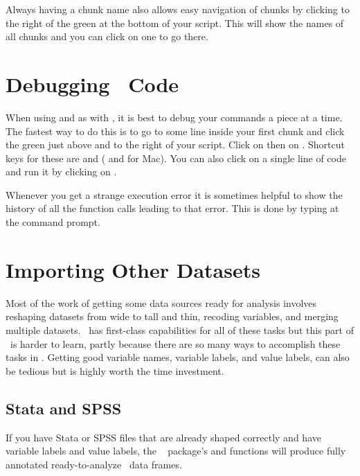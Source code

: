 Always having a chunk name also allows easy navigation of chunks by
clicking to the right of the green  at the bottom of your
script.  This will show the names of all chunks and you can click on
one to go there.

\section{Debugging \R\ Code}
When using  and  as with , it is
best to debug your commands a piece at a time.  The fastest way to do
this is to go to some line inside your first chunk and click the green
 just above and to the right of your script.  Click on  then on .  Shortcut keys for these
are  and  ( and  for Mac).  You can also click on a
single line of code and run it by clicking on .

Whenever you get a strange execution error it is sometimes helpful to
show the history of all the function calls leading to that error.
This is done by typing  at the command prompt.

\section{Importing Other Datasets}\label{sec:r-import}
Most of the work of getting some data sources ready for analysis involves
reshaping datasets from wide to tall and thin, recoding variables,
and merging multiple datasets.  \R\ has first-class capabilities for
all of these tasks but this part of \R\ is harder to learn, partly
because there are so many ways to accomplish these tasks in \R.
Getting good variable names, variable labels, and value labels, can
also be tedious but is highly worth the time investment.

\subsection{Stata and SPSS}
If you have Stata or SPSS files that are
already shaped correctly and have variable labels and value
labels, the \R\  package's  and
 functions will produce fully annotated
ready-to-analyze \R\ data frames.


